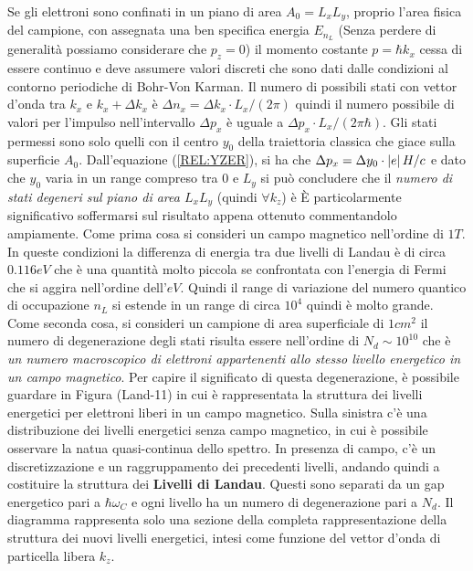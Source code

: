 Se gli elettroni sono confinati in un piano di area $A_0= L_xL_y$, proprio l'area fisica del campione, con assegnata una ben specifica energia $E_{n_L}$ (Senza perdere di generalit\`a possiamo considerare che $p_z=0$) il momento costante $p=\hbar k_x$ cessa di essere continuo e deve assumere valori discreti che sono dati dalle condizioni al contorno periodiche di Bohr-Von Karman. Il numero di possibili stati con vettor d'onda tra $k_x$ e $k_x+\Delta k_x$ \`e $\Delta n_x = \Delta k_x \cdot L_x/(2\pi)$ quindi il numero possibile di valori per l'impulso nell'intervallo $\Delta p_x$ \`e uguale a $\Delta p_x \cdot L_x/(2\pi\hbar)$. Gli stati permessi sono solo quelli con il centro $y_0$ della traiettoria classica che giace sulla superficie $A_0$. Dall'equazione (\ref{REL:YZER}), si ha che $\Delta p_x = \Delta y_0 \cdot \abs{e} H/ c$ e dato che $y_0$ varia in un range compreso tra $0$ e $L_y$ si pu\`o concludere che il \textit{numero di stati degeneri sul piano di area $L_xL_y$} (quindi $\forall k_z$) \`e
\`E particolarmente significativo  soffermarsi sul risultato appena ottenuto commentandolo ampiamente. Come prima cosa si consideri un campo magnetico nell'ordine di $1T$. In queste condizioni la differenza di energia tra due livelli di Landau \`e di circa $0.116eV$ che \`e una quantit\`a molto piccola se confrontata con l'energia di Fermi che si aggira nell'ordine dell'$eV$. Quindi il range di variazione del numero quantico di occupazione $n_L$ si estende in un range di circa $10^4$ quindi \`e molto grande. Come seconda cosa, si consideri un campione di area superficiale di $1cm^2$ il numero di degenerazione degli stati risulta essere nell'ordine di $N_d \sim 10^{10}$ che \`e \textit{un numero macroscopico di elettroni appartenenti allo stesso livello energetico in un campo magnetico}. Per capire il significato di questa degenerazione, \`e possibile guardare in Figura (Land-11) in cui \`e rappresentata la struttura dei livelli energetici per elettroni liberi in un campo magnetico. Sulla sinistra c'\`e una distribuzione dei livelli energetici senza campo magnetico, in cui \`e possibile osservare la natua quasi-continua dello spettro. In presenza di campo, c'\`e un discretizzazione e un raggruppamento dei precedenti livelli, andando quindi a costituire la struttura dei \textbf{Livelli di Landau}. Questi sono separati da un gap energetico pari a $\hbar\omega_C$ e ogni livello ha un numero di degenerazione pari a $N_d$. Il diagramma rappresenta solo una sezione della completa rappresentazione della struttura dei nuovi livelli energetici, intesi come funzione del vettor d'onda di particella libera $k_z$.

